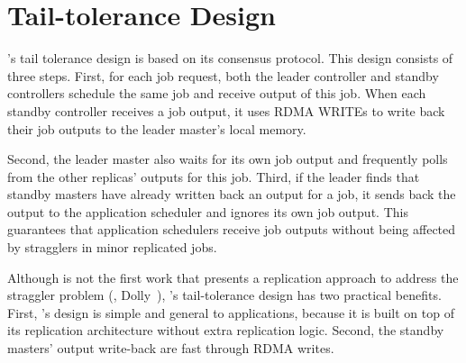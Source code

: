 \section{Tail-tolerance Design} \label{sec:tail}

\xxx's tail tolerance design is based on its \paxos consensus protocol. This 
design consists of three steps. First, for each job request, both the leader 
controller and standby controllers schedule the same job and receive output of 
this job. When each standby controller receives a job output, it 
uses RDMA WRITEs to write back their job outputs to the leader master's local 
memory.

Second, the leader master also waits for its own job output and frequently 
polls from the other replicas' outputs for this job. Third, if the leader finds 
that standby masters have already written back an output for a job, it sends 
back the output to the application scheduler and ignores its own job output. 
This guarantees that application schedulers receive job outputs without being 
affected by stragglers in minor replicated jobs.

Although \xxx is not the first work that presents a replication approach to 
address the straggler problem (\eg, Dolly~\cite{dolly:nsdi13}), \xxx's 
tail-tolerance design has two practical benefits. First, \xxx's design is 
simple and general to applications, because it is built on top of its \paxos 
replication architecture without extra replication logic. Second, the standby 
masters' output write-back are fast through RDMA writes. 
